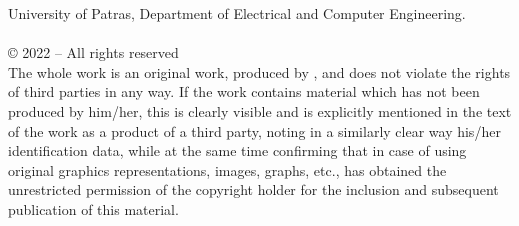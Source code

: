 \pagestyle{empty}
\mbox{}
\vfill
University of Patras, Department of Electrical and Computer Engineering.\\
\fullname\\
© 2022 – All rights reserved\\
The whole work is an original work, produced by \fullname, 
and does not violate the rights of third parties in any way. If the work 
contains material which has not been produced by him/her, this is clearly 
visible and is explicitly mentioned in the text of the work as a product of a 
third party, noting in a similarly clear way his/her identification data, 
while at the same time confirming that in case of using original graphics 
representations, images, graphs, etc., has obtained the unrestricted 
permission of the copyright holder for the inclusion and subsequent 
publication of this material.
